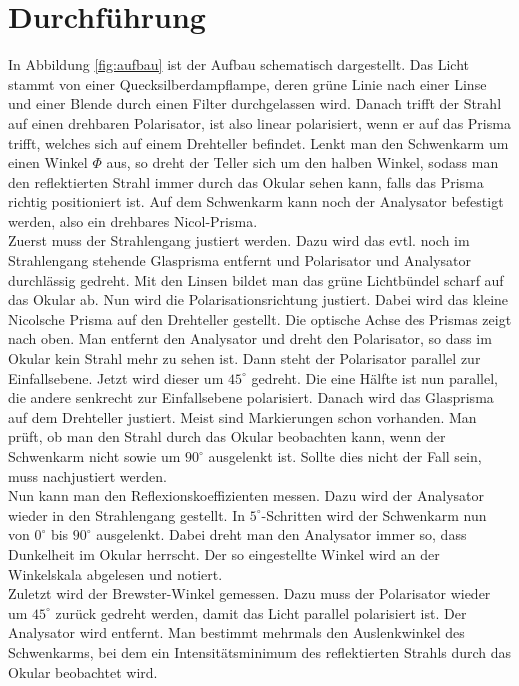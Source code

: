 \documentclass[12pt,a4paper,titlepage,headinclude,bibtotoc]{scrartcl}
\begin{document}
\section{Durchführung}
\label{sec:durchfuehrung}
In Abbildung \ref{fig:aufbau} ist der Aufbau schematisch dargestellt.
Das Licht stammt von einer Quecksilberdampflampe, deren grüne Linie nach einer Linse und einer Blende durch einen Filter durchgelassen wird.
Danach trifft der Strahl auf einen drehbaren Polarisator, ist also linear polarisiert, wenn er auf das Prisma trifft, welches sich auf einem Drehteller befindet.
Lenkt man den Schwenkarm um einen Winkel $\Phi$ aus, so dreht der Teller sich um den halben Winkel, sodass man den reflektierten Strahl immer durch das Okular sehen kann, falls das Prisma richtig positioniert ist.
Auf dem Schwenkarm kann noch der Analysator befestigt werden, also ein drehbares Nicol-Prisma.\\ 

Zuerst muss der Strahlengang justiert werden.
Dazu wird das evtl. noch im Strahlengang stehende Glasprisma entfernt und Polarisator und Analysator durchlässig gedreht.
Mit den Linsen bildet man das grüne Lichtbündel scharf auf das Okular ab.
Nun wird die Polarisationsrichtung justiert.
Dabei wird das kleine Nicolsche Prisma auf den Drehteller gestellt.
Die optische Achse des Prismas zeigt nach oben.
Man entfernt den Analysator und dreht den Polarisator, so dass im Okular kein Strahl mehr zu sehen ist.
Dann steht der Polarisator parallel zur Einfallsebene.
Jetzt wird dieser um $45^\circ$ gedreht.
Die eine Hälfte ist nun parallel, die andere senkrecht zur Einfallsebene polarisiert.
Danach wird das Glasprisma auf dem Drehteller justiert.
Meist sind Markierungen schon vorhanden.
Man prüft, ob man den Strahl durch das Okular beobachten kann, wenn der Schwenkarm nicht sowie um $90^\circ$ ausgelenkt ist.
Sollte dies nicht der Fall sein, muss nachjustiert werden.\\

Nun kann man den Reflexionskoeffizienten messen.
Dazu wird der Analysator wieder in den Strahlengang gestellt.
In $5^\circ$-Schritten wird der Schwenkarm nun von $0^\circ$ bis $90^\circ$ ausgelenkt.
Dabei dreht man den Analysator immer so, dass Dunkelheit im Okular herrscht.
Der so eingestellte Winkel wird an der Winkelskala abgelesen und notiert.\\

Zuletzt wird der Brewster-Winkel gemessen.
Dazu muss der Polarisator wieder um $45^\circ$ zurück gedreht werden, damit das Licht parallel polarisiert ist.
Der Analysator wird entfernt.
Man bestimmt mehrmals den Auslenkwinkel des Schwenkarms, bei dem ein Intensitätsminimum des reflektierten Strahls durch das Okular beobachtet wird.
\end{document}
